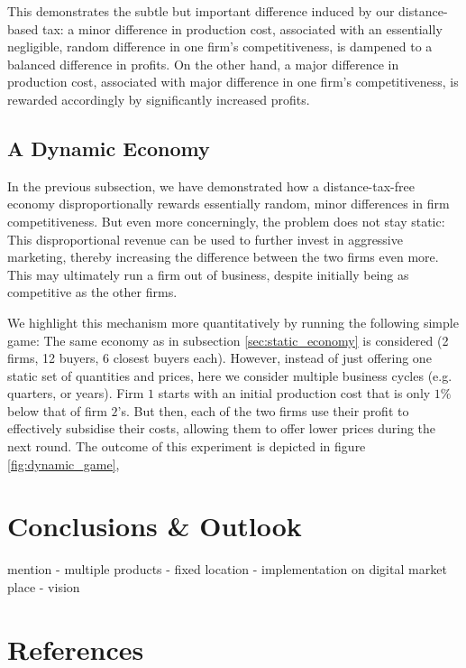 \documentclass[final,3p,times,authoryear,12pt]{elsarticle}
\newcommand{\red}[1]{\textcolor{WildStrawberry}{#1}} %
\begin{document}
This demonstrates the subtle but important difference induced by our distance-based tax:
a minor difference in production cost, associated with an essentially negligible, random difference in one firm's competitiveness, is dampened to a balanced difference in profits. 
On the other hand, a major difference in production cost, associated with major difference in one firm's competitiveness, is rewarded accordingly by significantly increased profits. 


\subsection{A Dynamic Economy} 

In the previous subsection, we have demonstrated how a distance-tax-free economy disproportionally rewards essentially random, minor differences in firm competitiveness. 
But even more concerningly, the problem does not stay static: 
This disproportional revenue can be used to further invest in aggressive marketing, thereby increasing the difference between the two firms even more. 
This may ultimately run a firm out of business, despite initially being as competitive as the other firms. 

We highlight this mechanism more quantitatively by running the following simple game:
The same economy as in subsection \ref{sec:static_economy} is considered (2 firms, 12 buyers, 6 closest buyers each). 
However, instead of just offering one static set of quantities and prices, here we consider multiple business cycles (e.g. quarters, or years). 
Firm $1$ starts with an initial production cost that is only $1\%$ below that of firm $2$'s. 
But then, each of the two firms use their profit to effectively subsidise their costs, allowing them to offer lower prices during the next round. 
The outcome of this experiment is depicted in figure \ref{fig:dynamic_game}, 


\section{Conclusions \& Outlook}
\label{sec:conclusions} 

\red{
mention
- multiple products
- fixed location
- implementation on digital market place
- vision
} 

\section*{References}


\end{document}
